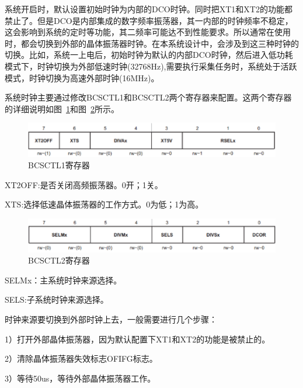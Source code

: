 

系统开启时，默认设置初始时钟为内部的DCO时钟。同时把XT1和XT2的功能都禁止了。但是DCO是内部集成的数字频率振荡器，其一内部的时钟频率不稳定，这会影响到系统的定时等功能，其二频率可能达不到性能要求。所以通常在使用时，都会切换到外部的晶体振荡器时钟。在本系统设计中，会涉及到这三种时钟的切换。比如，系统一上电后，初始时钟为默认的内部DCO时钟，然后进入低功耗模式下，时钟切换为外部低速时钟(32768Hz),需要执行采集任务时，系统处于活跃模式，时钟切换为高速外部时钟(16MHz)。

系统时钟主要通过修改BCSCTL1和BCSCTL2两个寄存器来配置。这两个寄存器的详细说明如图~\ref{fig:BCSCTL1寄存器}和图~\ref{fig:BCSCTL2寄存器}所示。
\begin{figure}[ht]
    \centering
	\includegraphics[width=1\textwidth]{fig/BCSCTL1寄存器.png}
	\caption{BCSCTL1寄存器}
	\label{fig:BCSCTL1寄存器}
\end{figure}

XT2OFF:是否关闭高频振荡器。0开；1关。

XTS:选择低速晶体振荡器的工作方式。0为低；1为高。

\begin{figure}[ht]
    \centering
	\includegraphics[width=1\textwidth]{fig/BCSCTL2寄存器.png}
	\caption{BCSCTL2寄存器}
	\label{fig:BCSCTL2寄存器}
\end{figure}
SELMx：主系统时钟来源选择。

SELS:子系统时钟来源选择。

时钟来源要切换到外部时钟上去，一般需要进行几个步骤：

1）打开外部晶体振荡器，因为默认配置下XT1和XT2的功能是被禁止的。

2）清除晶体振荡器失效标志OFIFG标志。

3）等待50us，等待外部晶体振荡器工作。

